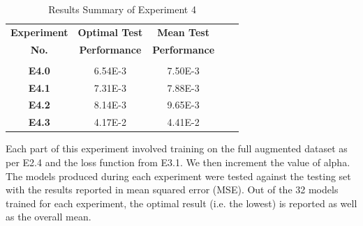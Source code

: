 \begin{table}[h!]
	 \begin{center}
		
		\begin{tabular}{c|c|c|r|c} %
			\textbf{Experiment} & \textbf{Optimal Test} & \textbf{Mean Test}  \\
			
			\textbf{No.} & \textbf{Performance} & \textbf{Performance}  \\
			
			\hline
			& & \\
			\textbf{E4.0} & 6.54E-3 & 7.50E-3 \\
			\textbf{E4.1} & 7.31E-3 & 7.88E-3 \\
			\textbf{E4.2} & 8.14E-3 & 9.65E-3 \\
			\textbf{E4.3} & 4.17E-2 & 4.41E-2 \\
			
			
		\end{tabular}
		\caption{Results Summary of Experiment 4} {Each part of this experiment involved training on the full augmented dataset as per E2.4 and the loss function from E3.1. We then increment the value of alpha. The models produced during each experiment were tested against the testing set with the results reported in mean squared error (MSE). Out of the 32 models trained for each experiment, the optimal result (i.e. the lowest) is reported as well as the overall mean.  }
		\label{tab:Experiment4results}
		 \end{center}
\end{table}


